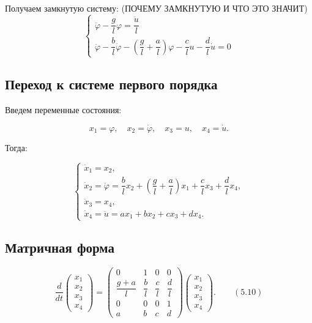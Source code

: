 \documentclass[a4paper, 12pt]{article}
\begin{document}
Получаем замкнутую систему: (ПОЧЕМУ ЗАМКНУТУЮ И ЧТО ЭТО ЗНАЧИТ)
\[
\begin{cases}
\ddot{\varphi} - \dfrac{g}{l} \varphi = \dfrac{\ddot{u}}{l} \\[10pt]
\ddot{\varphi} - \dfrac{b}{l} \dot{\varphi} - \left( \dfrac{g}{l} + \dfrac{a}{l} \right) \varphi - \dfrac{c}{l} u - \dfrac{d}{l} \dot{u} = 0
\end{cases}
\]

\subsection{Переход к системе первого порядка}

Введем переменные состояния:

\[
x_1 = \varphi, \quad x_2 = \dot{\varphi}, \quad x_3 = u, \quad x_4 = \dot{u}.
\]

Тогда:

\[
\begin{cases}
\dot{x}_1 = x_2, \\[1em]
\dot{x}_2 = \ddot{\varphi} = \dfrac{b}{l} x_2 + \left( \dfrac{g}{l} + \dfrac{a}{l} \right) x_1 + \dfrac{c}{l} x_3 + \dfrac{d}{l} x_4, \\[1em]
\dot{x}_3 = x_4, \\[1em]
\dot{x}_4 = \ddot{u} = a x_1 + b x_2 + c x_3 + d x_4.
\end{cases}
\]

\subsection{Матричная форма}

\[
\frac{d}{dt}
\begin{pmatrix}
x_1 \\ x_2 \\ x_3 \\ x_4
\end{pmatrix}
=
\begin{pmatrix}
0 & 1 & 0 & 0 \\[1em]
\dfrac{g + a}{l} & \dfrac{b}{l} & \dfrac{c}{l} & \dfrac{d}{l} \\[1em]
0 & 0 & 0 & 1 \\[1em]
a & b & c & d
\end{pmatrix}
\begin{pmatrix}
x_1 \\ x_2 \\ x_3 \\ x_4
\end{pmatrix}. \qquad (5.10)
\]
\end{document}
